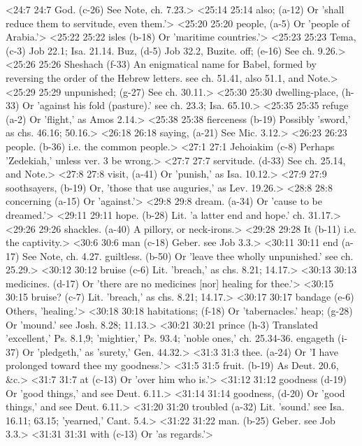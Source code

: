 <24:7 24:7  God. (c-26)  See Note, ch. 7.23.>
<25:14 25:14  also; (a-12)  Or 'shall reduce them to servitude, even them.'>
<25:20 25:20  people, (a-5)  Or 'people of Arabia.'>
<25:22 25:22  isles (b-18)  Or 'maritime countries.'>
<25:23 25:23  Tema, (c-3)  Job 22.1; Isa. 21.14.
  Buz, (d-5)  Job 32.2, Buzite.
  off; (e-16)  See ch. 9.26.>
<25:26 25:26  Sheshach (f-33)  An enigmatical name for Babel, formed by reversing the  order of the Hebrew letters. see ch. 51.41, also 51.1, and  Note.>
<25:29 25:29  unpunished; (g-27)  See ch. 30.11.>
<25:30 25:30  dwelling-place, (h-33)  Or 'against his fold (pasture).' see ch. 23.3; Isa. 65.10.>
<25:35 25:35  refuge (a-2)  Or 'flight,' as Amos 2.14.>
<25:38 25:38  fierceness (b-19)  Possibly 'sword,' as chs. 46.16; 50.16.>
<26:18 26:18  saying, (a-21)  See Mic. 3.12.>
<26:23 26:23  people. (b-36)  i.e. the common people.>
<27:1 27:1  Jehoiakim (c-8)  Perhaps 'Zedekiah,' unless ver. 3 be wrong.>
<27:7 27:7  servitude. (d-33)  See ch. 25.14, and Note.>
<27:8 27:8  visit, (a-41)  Or 'punish,' as Isa. 10.12.>
<27:9 27:9  soothsayers, (b-19)  Or, 'those that use auguries,' as Lev. 19.26.>
<28:8 28:8  concerning (a-15)  Or 'against.'>
<29:8 29:8  dream. (a-34)  Or 'cause to be dreamed.'>
<29:11 29:11  hope. (b-28)  Lit. 'a latter end and hope.' ch. 31.17.>
<29:26 29:26  shackles. (a-40)  A pillory, or neck-irons.>
<29:28 29:28  It (b-11)  i.e. the captivity.>
<30:6 30:6  man (c-18)  Geber. see Job 3.3.>
<30:11 30:11  end (a-17)  See Note, ch. 4.27.
  guiltless. (b-50)  Or 'leave thee wholly unpunished.' see ch. 25.29.>
<30:12 30:12  bruise (c-6) Lit. 'breach,' as chs. 8.21; 14.17.>
<30:13 30:13  medicines. (d-17)  Or 'there are no medicines [nor] healing for thee.'>
<30:15 30:15  bruise? (c-7)  Lit. 'breach,' as chs. 8.21; 14.17.>
<30:17 30:17  bandage (e-6)  Others, 'healing.'>
<30:18 30:18  habitations; (f-18)  Or 'tabernacles.'
  heap; (g-28)  Or 'mound.' see Josh. 8.28; 11.13.>
<30:21 30:21  prince (h-3)  Translated 'excellent,' Ps. 8.1,9; 'mightier,' Ps. 93.4;  'noble ones,' ch. 25.34-36.
  engageth (i-37)  Or 'pledgeth,' as 'surety,' Gen. 44.32.>
<31:3 31:3  thee. (a-24)  Or 'I have prolonged toward thee my goodness.'>
<31:5 31:5  fruit. (b-19)  As Deut. 20.6, &c.>
<31:7 31:7  at (c-13)  Or 'over him who is.'>
<31:12 31:12  goodness (d-19) Or 'good things,' and see Deut. 6.11.>
<31:14 31:14  goodness, (d-20)  Or 'good things,' and see Deut. 6.11.>
<31:20 31:20  troubled (a-32)  Lit. 'sound.' see Isa. 16.11; 63.15; 'yearned,' Cant. 5.4.>
<31:22 31:22  man. (b-25)  Geber. see Job 3.3.>
<31:31 31:31  with (c-13)  Or 'as regards.'>
